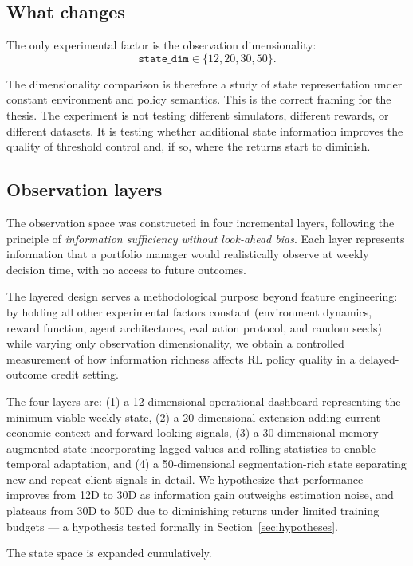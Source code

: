 \documentclass[12pt,a4paper]{article}
\begin{document}
\subsection{What changes}

The only experimental factor is the observation dimensionality:
\[
    \texttt{state\_dim} \in \{12, 20, 30, 50\}.
\]

The dimensionality comparison is therefore a study of state representation under constant environment and policy semantics. This is the correct framing for the thesis. The experiment is not testing different simulators, different rewards, or different datasets. It is testing whether additional state information improves the quality of threshold control and, if so, where the returns start to diminish.

\subsection{Observation layers}

The observation space was constructed in four incremental layers,
following the principle of \textit{information sufficiency without
    look-ahead bias}. Each layer represents information that a portfolio
manager would realistically observe at weekly decision time, with no
access to future outcomes.

The layered design serves a methodological purpose beyond feature
engineering: by holding all other experimental factors constant
(environment dynamics, reward function, agent architectures, evaluation
protocol, and random seeds) while varying only observation dimensionality,
we obtain a controlled measurement of how information richness affects
RL policy quality in a delayed-outcome credit setting.

The four layers are: (1) a 12-dimensional operational dashboard
representing the minimum viable weekly state, (2) a 20-dimensional
extension adding current economic context and forward-looking signals,
(3) a 30-dimensional memory-augmented state incorporating lagged values
and rolling statistics to enable temporal adaptation, and (4) a
50-dimensional segmentation-rich state separating new and repeat client
signals in detail. We hypothesize that performance improves from 12D
to 30D as information gain outweighs estimation noise, and plateaus
from 30D to 50D due to diminishing returns under limited training
budgets --- a hypothesis tested formally in Section~\ref{sec:hypotheses}.

The state space is expanded cumulatively.
\end{document}
